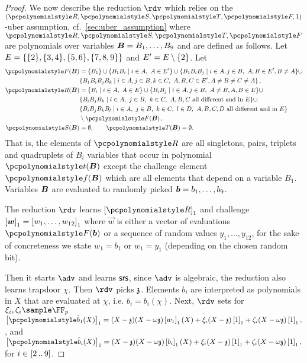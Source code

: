 \begin{proof}
 We now describe the reduction $\rdv$ which
relies on the $(\pR, \pS, \pT, \pF, 1)$-uber assumption, cf.~\cref{sec:uber_assumption}
where $\pR, \pS, \pT, \pF$ are polynomials over variables
$\vB = B_1, \ldots, B_9$ and are defined as follows. Let
$E = \{\{2\}, \{3, 4\}, \{5, 6\}, \{7, 8,
    9\}\}$ and $E' = E \setminus \{2\}$. Let
\begin{align}
\label{eq:uber}
\pF(\vB) & = \smallset{B_1} \cup \smallset{B_1B_i \mid i \in A,\ A \in E'} \cup
             \smallset{B_1B_iB_j \mid i \in A, j \in B,\ A, B \in E', B
             \neq A} \cup \notag\\
           & \smallset{B_1B_iB_jB_k \mid i \in A, j \in
             B, k \in C,\ A, B, C \in E', A \neq B \neq C \neq A}\notag\,,\\
  \pR(\vB) & = \smallset{B_i \mid i \in A,\ A \in E} \cup \smallset{B_i B_j \mid i \in
             A, j \in B,\ A \neq B, A, B \in E} \cup \\ 
           & \smallset{B_i B_j B_k \mid i \in A,\ j \in
             B,\ k \in C,\
             A, B, C \text{ all different and in } E} \cup \notag \\
           & \smallset{B_i B_j B_k B_l \mid i \in A,\ j \in B,\ k \in C,\ l \in D,\
             A, B, C, D \text{ all different and in } E} \notag \\
           & \setminus \pF(\vB)\,,\notag \\
  \pS(\vB) & = \emptyset, \qquad \pT(\vB) = \emptyset.
\end{align}
That is, the elements of $\pR$ are all singletons, pairs, triplets and
quadruplets of $B_i$ variables that occur in polynomial $\pt(\vB)$ except the
challenge element $\pf(\vB)$ which are all elements that depend on a variable
$B_1$. Variables $\vB$ are evaluated to randomly picked
$\vb = b_1, \ldots, b_9$.

The reduction $\rdv$ learns $\gone{\pR}$ and challenge
$\gone{\vec{w}} = \gone{w_1, \ldots, w_{12}}$ where $\vec{w}$ is either a vector
of evaluations $\pF(\vb)$ or a sequence of random values $y_1, \ldots, y_{12}$,
for the sake of concreteness we state $w_1 = b_1$ or $w_1 = y_1$ (depending on
the chosen random bit).

Then it starts $\adv$ and learns $\mathsf{srs}$, since $\adv$ is algebraic, the reduction also learns trapdoor $\chi$. Then $\rdv$ picks $\mathfrak{z}$. Elements $b_i$ are interpreted as polynomials in $X$ that are
evaluated at $\chi$, i.e. $b_i = b_i(\chi)$. Next, $\rdv$ sets for
$\xi_i, \zeta_i \sample \FF_p$
\(
  \gone{\p{\tb}_1(X)} =
(X - \chz)(X - \ochz) \gone{w_1}(X) + \xi_i (X - \chz) \gone{1} +
\zeta_i (X - \ochz) \gone{1}, %
\),
and
\(
  \gone{\p{\tb}_i(X)} =
(X - \chz)(X - \ochz) \gone{b_i}(X) + \xi_i (X - \chz) \gone{1} +
\zeta_i (X - \ochz) \gone{1}, %
\) 
for $i \in [2 \, .. \, 9]$.


\end{proof}
